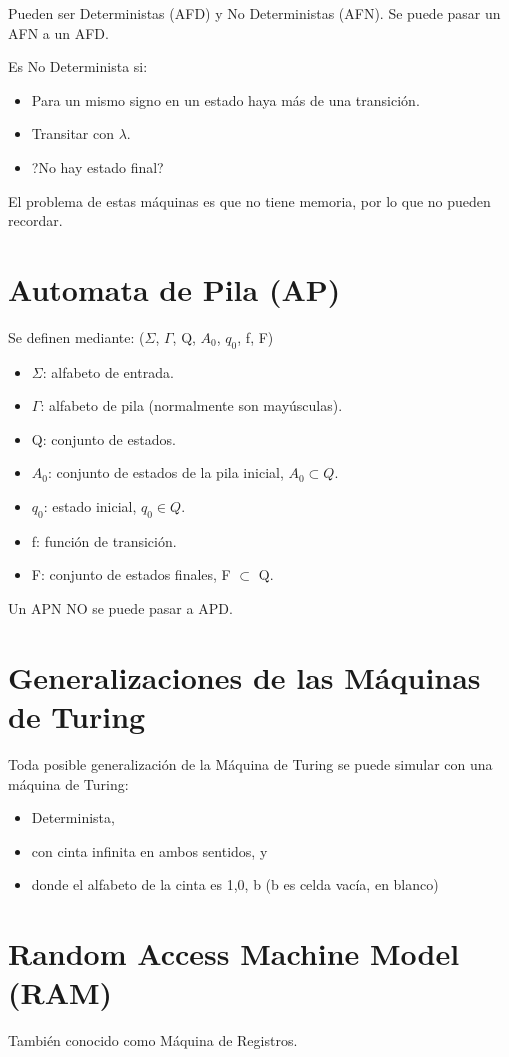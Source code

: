 Pueden ser Deterministas (AFD) y No Deterministas (AFN). Se puede pasar un AFN a un AFD.

Es No Determinista si:
\begin{itemize}
    \item Para un mismo signo en un estado haya más de una transición.
    \item Transitar con $\lambda$.
    \item ?No hay estado final?
\end{itemize}

El problema de estas máquinas es que no tiene memoria, por lo que no pueden recordar.

\section{Automata de Pila (AP)}
Se definen mediante: ($\Sigma$, $\Gamma$, Q, $A_0$, $q_0$, f, F)
\begin{itemize}
    \item $\Sigma$: alfabeto de entrada.
    \item $\Gamma$: alfabeto de pila (normalmente son mayúsculas).
    \item Q: conjunto de estados.
    \item $A_0$: conjunto de estados de la pila inicial, $A_0 \subset Q$.
    \item $q_0$: estado inicial, $q_0 \in Q$.
    \item f: función de transición.
    \item F: conjunto de estados finales, F $\subset$ Q.
\end{itemize}

Un APN NO se puede pasar a APD.

\section{Generalizaciones de las Máquinas de Turing}
Toda posible generalización de la Máquina de Turing se puede simular con una máquina de Turing: 
\begin{itemize}
    \item Determinista, 
    \item con cinta infinita en ambos sentidos, y \item donde el alfabeto de la cinta es {1,0, b} (b es celda vacía, en blanco)
\end{itemize}

\section{Random Access Machine Model (RAM)}
También conocido como Máquina de Registros.

